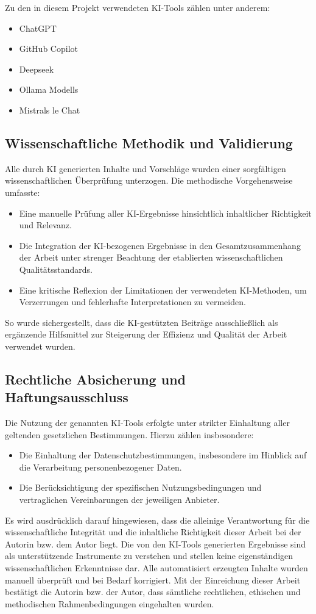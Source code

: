 \newpage

Zu den in diesem Projekt verwendeten KI-Tools zählen unter anderem:
\begin{itemize}
    \item ChatGPT
    \item GitHub Copilot
    \item Deepseek
    \item Ollama Modells
    \item Mistrals le Chat
\end{itemize}

\subsection*{Wissenschaftliche Methodik und Validierung}
Alle durch KI generierten Inhalte und Vorschläge wurden einer sorgfältigen wissenschaftlichen Überprüfung unterzogen. Die methodische Vorgehensweise umfasste:
\begin{itemize}
    \item Eine manuelle Prüfung aller KI-Ergebnisse hinsichtlich inhaltlicher Richtigkeit und Relevanz.
    \item Die Integration der KI-bezogenen Ergebnisse in den Gesamtzusammenhang der Arbeit unter strenger Beachtung der etablierten wissenschaftlichen Qualitätsstandards.
    \item Eine kritische Reflexion der Limitationen der verwendeten KI-Methoden, um Verzerrungen und fehlerhafte Interpretationen zu vermeiden.
\end{itemize}
So wurde sichergestellt, dass die KI-gestützten Beiträge ausschließlich als ergänzende Hilfsmittel zur Steigerung der Effizienz und Qualität der Arbeit verwendet wurden.

\subsection*{Rechtliche Absicherung und Haftungsausschluss}
Die Nutzung der genannten KI-Tools erfolgte unter strikter Einhaltung aller geltenden gesetzlichen Bestimmungen. Hierzu zählen insbesondere:
\begin{itemize}
    \item Die Einhaltung der Datenschutzbestimmungen, insbesondere im Hinblick auf die Verarbeitung personenbezogener Daten.
    \item Die Berücksichtigung der spezifischen Nutzungsbedingungen und vertraglichen Vereinbarungen der jeweiligen Anbieter.
\end{itemize}
Es wird ausdrücklich darauf hingewiesen, dass die alleinige Verantwortung für die wissenschaftliche Integrität und die inhaltliche Richtigkeit dieser Arbeit bei der Autorin bzw. dem Autor liegt. Die von den KI-Tools generierten Ergebnisse sind als unterstützende Instrumente zu verstehen und stellen keine eigenständigen wissenschaftlichen Erkenntnisse dar. Alle automatisiert erzeugten Inhalte wurden manuell überprüft und bei Bedarf korrigiert. Mit der Einreichung dieser Arbeit bestätigt die Autorin bzw. der Autor, dass sämtliche rechtlichen, ethischen und methodischen Rahmenbedingungen eingehalten wurden.

